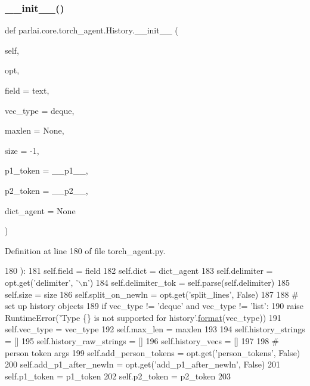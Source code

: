 \subsubsection{\texorpdfstring{\+\_\+\+\_\+init\+\_\+\+\_\+()}{\_\_init\_\_()}}
{\footnotesize\ttfamily def parlai.\+core.\+torch\+\_\+agent.\+History.\+\_\+\+\_\+init\+\_\+\+\_\+ (\begin{DoxyParamCaption}\item[{}]{self,  }\item[{}]{opt,  }\item[{}]{field = {\ttfamily \textquotesingle{}text\textquotesingle{}},  }\item[{}]{vec\+\_\+type = {\ttfamily \textquotesingle{}deque\textquotesingle{}},  }\item[{}]{maxlen = {\ttfamily None},  }\item[{}]{size = {\ttfamily -\/1},  }\item[{}]{p1\+\_\+token = {\ttfamily \textquotesingle{}\+\_\+\+\_\+p1\+\_\+\+\_\+\textquotesingle{}},  }\item[{}]{p2\+\_\+token = {\ttfamily \textquotesingle{}\+\_\+\+\_\+p2\+\_\+\+\_\+\textquotesingle{}},  }\item[{}]{dict\+\_\+agent = {\ttfamily None} }\end{DoxyParamCaption})}



Definition at line 180 of file torch\+\_\+agent.\+py.


\begin{DoxyCode}
180     ):
181         self.field = field
182         self.dict = dict\_agent
183         self.delimiter = opt.get(\textcolor{stringliteral}{'delimiter'}, \textcolor{stringliteral}{'\(\backslash\)n'})
184         self.delimiter\_tok = self.parse(self.delimiter)
185         self.size = size
186         self.split\_on\_newln = opt.get(\textcolor{stringliteral}{'split\_lines'}, \textcolor{keyword}{False})
187 
188         \textcolor{comment}{# set up history objects}
189         \textcolor{keywordflow}{if} vec\_type != \textcolor{stringliteral}{'deque'} \textcolor{keywordflow}{and} vec\_type != \textcolor{stringliteral}{'list'}:
190             \textcolor{keywordflow}{raise} RuntimeError(\textcolor{stringliteral}{'Type \{\} is not supported for history'}.\hyperlink{namespaceparlai_1_1chat__service_1_1services_1_1messenger_1_1shared__utils_a32e2e2022b824fbaf80c747160b52a76}{format}(vec\_type))
191         self.vec\_type = vec\_type
192         self.max\_len = maxlen
193 
194         self.history\_strings = []
195         self.history\_raw\_strings = []
196         self.history\_vecs = []
197 
198         \textcolor{comment}{# person token args}
199         self.add\_person\_tokens = opt.get(\textcolor{stringliteral}{'person\_tokens'}, \textcolor{keyword}{False})
200         self.add\_p1\_after\_newln = opt.get(\textcolor{stringliteral}{'add\_p1\_after\_newln'}, \textcolor{keyword}{False})
201         self.p1\_token = p1\_token
202         self.p2\_token = p2\_token
203 
\end{DoxyCode}


